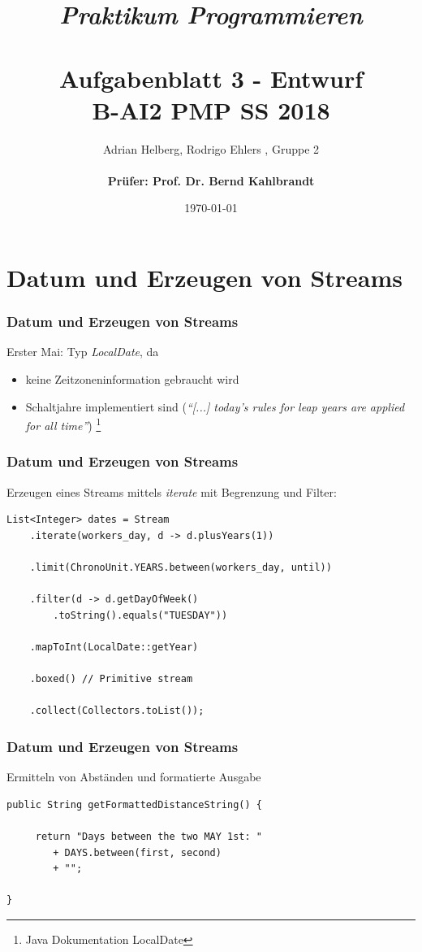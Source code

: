 \documentclass{beamer}
\title{
	\textit{Praktikum Programmieren} \\
	\textbf{\\Aufgabenblatt 3 - Entwurf} \\
	\scriptsize{B-AI2 PMP SS 2018}
}
\author{Adrian Helberg, Rodrigo Ehlers , Gruppe 2 \\\textbf{\\ Prüfer: Prof. Dr. Bernd Kahlbrandt}}
\date{\today}
\begin{document}

\maketitle

\frame{\tableofcontents}


\section{Datum und Erzeugen von Streams}
\begin{frame}
\frametitle{Datum und Erzeugen von Streams}

Erster Mai: Typ \textit{LocalDate}, da
\begin{itemize}
\setlength{\itemsep}{8pt}
\item keine Zeitzoneninformation gebraucht wird
\item Schaltjahre implementiert sind (\textit{``[...] today's rules for leap years are applied for all time''}) \footnote{Java Dokumentation LocalDate}
\end{itemize}

\end{frame}

\begin{frame}[fragile]
\frametitle{Datum und Erzeugen von Streams}

Erzeugen eines Streams mittels \textit{iterate} mit Begrenzung und Filter:

\begin{lstlisting}
List<Integer> dates = Stream
    .iterate(workers_day, d -> d.plusYears(1))

    .limit(ChronoUnit.YEARS.between(workers_day, until))

    .filter(d -> d.getDayOfWeek()
        .toString().equals("TUESDAY"))

    .mapToInt(LocalDate::getYear)

    .boxed() // Primitive stream

    .collect(Collectors.toList());
\end{lstlisting}

\end{frame}

\begin{frame}[fragile]
\frametitle{Datum und Erzeugen von Streams}

Ermitteln von Abst\"anden und formatierte Ausgabe

\begin{lstlisting}
public String getFormattedDistanceString() {

     return "Days between the two MAY 1st: " 
        + DAYS.between(first, second) 
        + "";

}
\end{lstlisting}

\end{frame}
\end{document}
